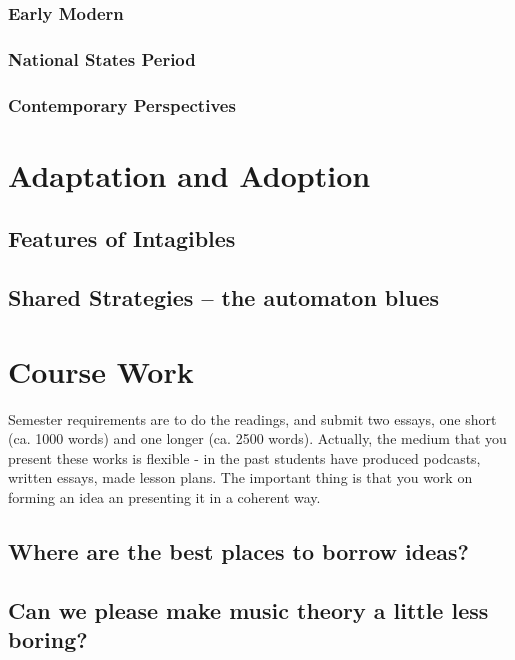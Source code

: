 \documentclass[11pt]{article}
\begin{document}
\subsubsection{Early Modern}
\label{sec:orgebda43c}
\subsubsection{National States Period}
\label{sec:orgc4979a3}
\subsubsection{Contemporary Perspectives}
\label{sec:orgbcd41d5}


\section{Adaptation and Adoption}
\label{sec:orgf2c7d4a}
\subsection{Features of Intagibles}
\label{sec:org1e866cf}
\subsection{Shared Strategies – the automaton blues}
\label{sec:org7fe44cb}


\section{Course Work}
\label{sec:org551d7f8}
Semester requirements are to do the readings, and submit two essays,
one short (ca. 1000 words) and one longer (ca. 2500 words). Actually,
the medium that you present these works is flexible - in the past
students have produced podcasts, written essays, made lesson
plans. The important thing is that you work on forming an idea an
presenting it in a coherent way. 

\subsection{Where are the best places to borrow ideas?}
\label{sec:org262bb17}
\subsection{Can we please make music theory a little less boring?}
\label{sec:org904fe63}
\end{document}
